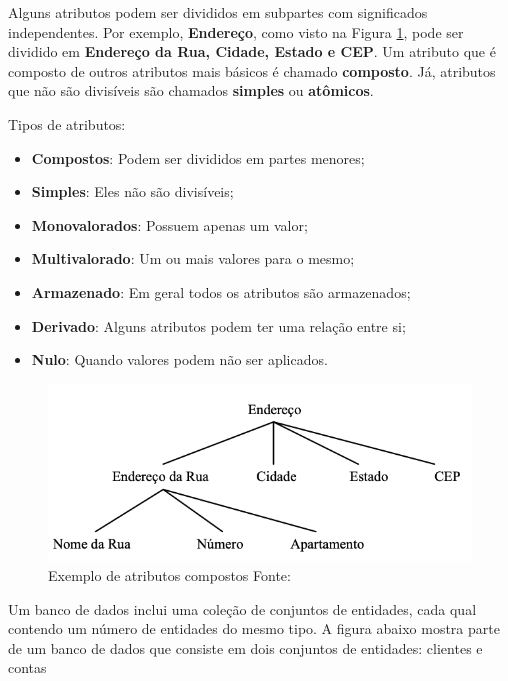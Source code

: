 Alguns atributos podem ser divididos em subpartes com significados independentes. Por exemplo, \textbf{Endereço}, como visto na Figura \ref{fig:atributos-compostos}, pode ser dividido em\textbf{ Endereço da Rua, Cidade, Estado e CEP}. Um atributo que é composto de outros atributos mais básicos é chamado \textbf{composto}. Já, atributos que não são divisíveis são chamados \textbf{simples} ou \textbf{atômicos}.

Tipos de atributos:

\begin{itemize}
	\item \textbf{Compostos}: Podem ser divididos em partes menores;
	\item \textbf{Simples}: Eles não são divisíveis;
	\item \textbf{Monovalorados}: Possuem apenas um valor;
	\item \textbf{Multivalorado}: Um ou mais valores para o mesmo;
	\item \textbf{Armazenado}: Em geral todos os atributos são armazenados;
	\item \textbf{Derivado}: Alguns atributos podem ter uma relação entre si;
	\item \textbf{Nulo}: Quando valores podem não ser aplicados.
\end{itemize}

\begin{figure}[H]
	\centering
	\includegraphics[scale=0.4]{imagens/atributos-compostos.png}
	\caption{
		Exemplo de atributos compostos
		Fonte: \cite{takai2005introduccao}
	}
	\label{fig:atributos-compostos}
\end{figure}

Um banco de dados inclui uma coleção de conjuntos de entidades, cada qual contendo um número de entidades do mesmo tipo. A figura abaixo mostra parte de um banco de dados que consiste em dois conjuntos de entidades: clientes e contas \cite{fundamentos2005Sanches}

